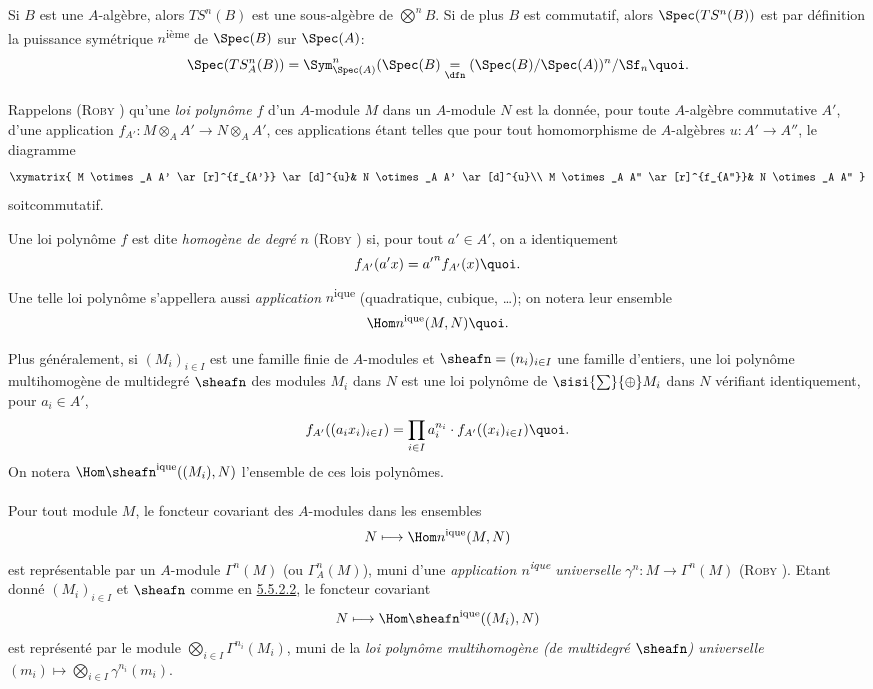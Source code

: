 Si $B$ est une $A$-algèbre, alors $TS^{n}(B)$ est une sous-algèbre de
$\bigotimes\limits^{n}B$. Si de plus $B$ est commutatif,
alors $\Spec (TS^{n}(B))$ est par définition la puissance symétrique
$n$\textsuperscript{ième} de $\Spec(B)$ sur $\Spec(A)$:
$$
\Spec(TS^{n}_{A}(B))=\Sym^{n}_{\Spec(A)}(\Spec(B)\underset{\dfn}{=}(\Spec(B)/\Spec(A))^{n}/\Sf_n{\quoi}.
$$

\paragraph{}
Rappelons (\textsc{Roby} \cite[I ]{Ro}) qu'une \emph{loi polynôme} $f$ d'un
$A$-module $M$ dans un $A$-module $N$ est la donnée, pour toute
$A$-algèbre commutative $A'$, d'une application
$f_{A'}:M\otimes_{A}A'\rightarrow N\otimes_{A}A'$, ces applications
étant telles que pour tout homomorphisme de $A$-algèbres
$u:A'\rightarrow A''$, le diagramme
\[
\xymatrix{
M \otimes_A A'  \ar[r]^{f_{A'}} \ar[d]^{u}& N \otimes_A A' \ar[d]^{u}\\
M \otimes_A A'' \ar[r]^{f_{A''}}& N \otimes_A A''
}
\]
soit\pageoriginale commutatif.

Une loi polynôme $f$ est dite \emph{homogène de degré} $n$ (\textsc{Roby} \cite[I
 p.~226]{Ro}) si, pour tout $a'\in A'$, on a identiquement
\[
f_{A'}(a'x)={a'}^{n}f_{A'}(x){\quoi}.
\]
Une telle loi polynôme s'appellera aussi \emph{application}
$n$\textsuperscript{ique} (quadratique, cubique, \ldots); on notera leur
ensemble
\[
\Hom n^{\text{\rm ique}} (M,N){\quoi}.
\]

Plus généralement, si $(M_{i})_{i\in I}$ est une famille finie de
$A$-modules et $\sheafn =(n_{i})_{i\in I}$ une famille d'entiers, une loi
polynôme multihomogène de multidegré $\sheafn $ des modules $M_{i}$ dans
$N$ est une loi polynôme de $\sisi{\sum}{\oplus} M_{i}$ dans $N$ vérifiant
identiquement, pour $a_{i}\in A'$,
\[
f_{A'}((a_{i}x_{i})_{i\in I})=\prod_{i\in I} a^{n_{i}}_i\cdot
f_{A'}((x_{i})_{i\in I}){\quoi}.
\]
On notera $\Hom \sheafn ^{\text{\rm ique}}((M_{i}),N)$ l'ensemble de ces
lois polynômes.

\paragraph{}
Pour tout module $M$, le foncteur covariant des $A$-modules dans les
ensembles
$$
N\longmapsto \Hom n^{\text{\rm ique}} (M,N)
$$
est représentable par un $A$-module $\Gamma^{n}(M)$ (ou
$\Gamma^{n}_{A}(M)$), muni d'une \emph{application\pageoriginale
$n$\textsuperscript{ique} universelle} $\gamma^{n}:M\rightarrow
\Gamma^{n}(M)$ (\textsc{Roby} \cite[IV 1 ]{Ro}). Etant donné $(M_{i})_{i\in I}$
et $\sheafn $ comme en \hyperref[XVII.par5.5.2.2]{5.5.2.2}, le foncteur covariant
$$
N\longmapsto \Hom \sheafn ^{\text{\rm ique}} ((M_{i}),N)
$$
est représenté par le module $\bigotimes\limits_{i\in
I}\Gamma^{n_i}(M_{i})$, muni de la \emph{loi polynôme multihomogène
(de multidegré $\sheafn $) universelle} $(m_{i})\mapsto
\bigotimes\limits_{i\in I}\gamma^{n_{i}}(m_{i})$.

